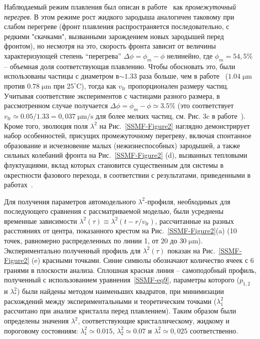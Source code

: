 Наблюдаемый режим плавления был описан в работе~\cite{10.1038/ncomms7942} как \emph{промежуточный перегрев}.
В этом режиме рост жидкого зародыша аналогичен таковому при слабом перегреве (фронт плавления распространяется последовательно, с редкими "скачками", вызванными зарождением новых зародышей перед фронтом), но несмотря на это, скорость фронта зависит от величины характеризующей степень ``перегрева''  $\Delta \phi = \phi_m - \phi $  нелинейно, где $ \phi_m = 54,5 \% $ -- объемная доля соответствующая плавлению.
Чтобы обосновать это, были использованы частицы с диаметром в$ \sim 1.33$  раза  больше, чем в работе~\cite{10.1038/ncomms7942} ($ 1.04 \; \mathrm{\mu m} $ против $ 0.78 \; \mathrm{\mu m} $ при $ 25 ^ {\circ} \mathrm{C} $), тогда как $ v_{\mathrm{fr}} $ пропорционален размеру частиц.
Учитывая соответствие экспериментов с частицами разного размера, в рассмотренном случае получается $ \Delta \phi = \phi_m - \phi \simeq 3.5 \% $ (это соответствует $ v_{\mathrm{fr}} \simeq 0.05 /1.33 = 0,037 \; \mathrm{\mu m / s} $ для более мелких частиц, см. Рис. 3c в работе~\cite{10.1038/ncomms7942}).
Кроме того, эволюция поля $\lambda^2$ на Рис.~\ref{SSMF-Figure2} наглядно демонстрирует набор особенностей, присущих промежуточному перегреву, включая спонтанное образование и исчезновение малых (нежизнеспособных) зародышей, а также сильных колебаний фронта на Рис.~\ref{SSMF-Figure2} (d), вызванных тепловыми флуктуациями, вклад которых становится существенным для системы в окрестности фазового перехода, в соответствии с результатами, приведенными в работах~\cite{10.1039/c7sm02291c, 10.1063/1.5059358}.

Для получения параметров автомодельного $ \lambda^2$-профиля, необходимых для последующего сравнения с рассматриваемой моделью, были усреднены временные зависимости $\lambda^2(\tau) \equiv \lambda^2(t-r/v_{\mathrm{fr}})$, рассчитанные на разных расстояниях от центра, показанного крестом на Рис.~\ref{SSMF-Figure2}(a) (10 точек, равномерно распределенных по линии 1, от $20$ до $30\; \mathrm{\mu m}$).
Экспериментально полученный профиль для $\lambda^2(\tau) $ показан на Рис.~\ref{SSMF-Figure2} (e) красными точками.
Синие символы обозначают количество ячеек с 6 гранями в плоскости анализа.
Сплошная красная линия -- самоподобный профиль, полученный с использованием уравнения~\eqref{SSMF-eq9}, параметры которого ($p_{1,2}$ и $ \lambda_\ast ^ 2$) были найдены методом наименьших квадратов, при минимизации расхождений между экспериментальными и теоретическим точками ($ \lambda_1 ^ 2 $ рассчитано при анализе кристалла перед плавлением).
Таким образом были определены значения $\lambda^2$, соответствующие кристаллическому, жидкому и пороговому состояниям: $ \lambda_1 ^ 2 \simeq 0.015 $, $ \lambda_2 ^ 2 \simeq 0.07 $ и $\lambda_\ast^2\simeq 0,025 $ соответственно.

